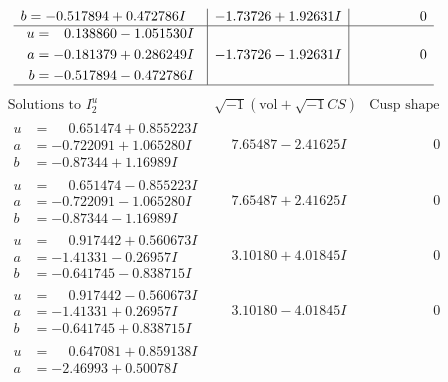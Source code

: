 \documentclass[1p]{elsarticle_modified}
\theoremstyle{definition}
\newcommand{\I}{\sqrt{-1}}
\begin{document}
$$\begin{array}{c|c|c}
\begin{aligned}
b &= -0.517894 + 0.472786 I\end{aligned}
 & -1.73726 + 1.92631 I & \phantom{-0.000000 } 0 \\ \hline\begin{aligned}
u &= \phantom{-}0.138860 - 1.051530 I \\
a &= -0.181379 + 0.286249 I \\
b &= -0.517894 - 0.472786 I\end{aligned}
 & -1.73726 - 1.92631 I & \phantom{-0.000000 } 0\\
 \hline 
 \end{array}$$\newpage$$\begin{array}{c|c|c}  
\text{Solutions to }I^u_{2}& \I (\text{vol} + \sqrt{-1}CS) & \text{Cusp shape}\\
 \hline 
\begin{aligned}
u &= \phantom{-}0.651474 + 0.855223 I \\
a &= -0.722091 + 1.065280 I \\
b &= -0.87344 + 1.16989 I\end{aligned}
 & \phantom{-}7.65487 - 2.41625 I & \phantom{-0.000000 } 0 \\ \hline\begin{aligned}
u &= \phantom{-}0.651474 - 0.855223 I \\
a &= -0.722091 - 1.065280 I \\
b &= -0.87344 - 1.16989 I\end{aligned}
 & \phantom{-}7.65487 + 2.41625 I & \phantom{-0.000000 } 0 \\ \hline\begin{aligned}
u &= \phantom{-}0.917442 + 0.560673 I \\
a &= -1.41331 - 0.26957 I \\
b &= -0.641745 - 0.838715 I\end{aligned}
 & \phantom{-}3.10180 + 4.01845 I & \phantom{-0.000000 } 0 \\ \hline\begin{aligned}
u &= \phantom{-}0.917442 - 0.560673 I \\
a &= -1.41331 + 0.26957 I \\
b &= -0.641745 + 0.838715 I\end{aligned}
 & \phantom{-}3.10180 - 4.01845 I & \phantom{-0.000000 } 0 \\ \hline\begin{aligned}
u &= \phantom{-}0.647081 + 0.859138 I \\
a &= -2.46993 + 0.50078 I \\

\end{aligned}
\end{array}$$
\end{document}

